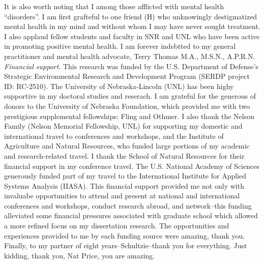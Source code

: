 \documentclass[12pt,twoside,openany]{reedthesis}
\begin{document}
It is also worth noting that I among those afflicted with mental health ``disorders''. I am first grafteful to one friend (H) who unknowingly destigmatized mental health in my mind and without whom I may have never sought treatment. I also applaud fellow students and faculty in SNR and UNL who have been active in promoting positive mental health. I am forever indebtted to my general practitioner and mental health advocate, Terry Thomas M.A., M.S.N., A.P.R.N.
\emph{Financial support}. This research was funded by the U.S. Department of Defense's Strategic Environmental Research and Development Program (SERDP project ID: RC-2510). The University of Nebraska-Lincoln (UNL) has been highy supportive in my doctoral studies and reserach. I am grateful for the generous of donors to the University of Nebraska Foundation, which provided me with two prestigious supplemental fellowships: Fling and Othmer. I also thank the Nelson Family (Nelson Memorial Fellowship, UNL) for supporting my domestic and international travel to conferences and workshops, and the Institute of Agriculture and Natural Resources, who funded large portions of my academic and research-related travel. I thank the School of Natural Resources for their financial support in my conference travel. The U.S. National Academy of Sciences generously funded part of my travel to the International Institute for Applied Systems Analysis (IIASA). This financial support provided me not only with invaluabe opportunities to attend and present at national and international conferences and workshops, conduct research abroad, and network--this funding alleviated some financial pressures associated with graduate school which allowed a more refined focus on my dissertation research. The opportunities and experiences provided to me by each funding source were amazing, thank you.
Finally, to my partner of eight years--Schultzie--thank you for everything. Just kidding, thank you, Nat Price, you are amazing.
%

  \hypersetup{linkcolor=black}
  \setcounter{tocdepth}{2}
  \tableofcontents

  \listoftables

  \listoffigures


%
\mainmatter %
\pagestyle{fancyplain} %
\doublespacing{} %
\end{document}
